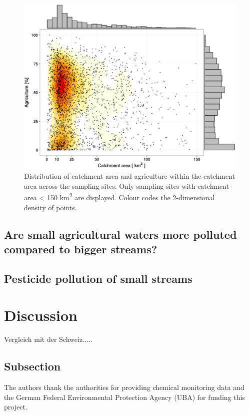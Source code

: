 \documentclass[journal=esthag,manuscript=article]{achemso}
\begin{document}
\begin{figure}
  \includegraphics[width=.8\textwidth]{fig/ezg_lu.pdf}
  \caption{Distribution of catchment area and agriculture within the catchment area across the sampling sites.
  Only sampling sites with catchment area < 150 km\textsuperscript{2} are displayed. 
  Colour codes the 2-dimensional density of points.
  }
  \label{fig:fig_ezg_lu}
\end{figure}


\subsection{Are small agricultural waters more polluted compared to bigger streams?}




\subsection{Pesticide pollution of small streams}




\section{Discussion}

Vergleich mit der Schweiz.....

\subsection{Subsection}






\begin{acknowledgement}
The authors thank the authorities for providing chemical monitoring data and the German Federal Environmental Protection Agency (UBA) for funding this project.
\end{acknowledgement}
\end{document}
